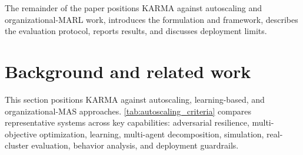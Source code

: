 \documentclass[journal]{IEEEtran}
\begin{document}
The remainder of the paper positions KARMA against autoscaling and organizational-MARL work, introduces the formulation and framework, describes the evaluation protocol, reports results, and discusses deployment limits.

\section{Background and related work}
\label{sec:related_work}

This section positions KARMA against autoscaling, learning-based, and organizational-MAS approaches. \autoref{tab:autoscaling_criteria} compares representative systems across key capabilities: adversarial resilience, multi-objective optimization, learning, multi-agent decomposition, simulation, real-cluster evaluation, behavior analysis, and deployment guardrails.
\end{document}
